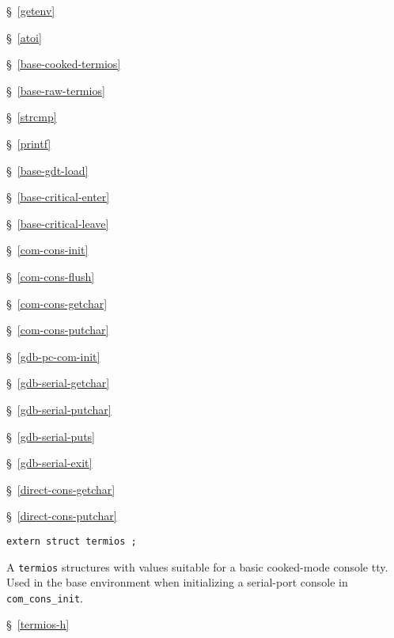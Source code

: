 \begin{apidep}
	\item[getenv]		\S~\ref{getenv}
	\item[atoi]		\S~\ref{atoi}
	\item[base_cooked_termios]	\S~\ref{base-cooked-termios}
	\item[base_raw_termios]	\S~\ref{base-raw-termios}
	\item[strcmp]		\S~\ref{strcmp}
	\item[printf]		\S~\ref{printf}
	\item[base_gdt_load]	\S~\ref{base-gdt-load}
	\item[base_critical_enter]	\S~\ref{base-critical-enter}
	\item[base_critical_leave]	\S~\ref{base-critical-leave}
	\item[com_cons_init]	\S~\ref{com-cons-init}
	\item[com_cons_flush]	\S~\ref{com-cons-flush}
	\item[com_cons_getchar]	\S~\ref{com-cons-getchar}
	\item[com_cons_putchar]	\S~\ref{com-cons-putchar}
	\item[gdb_pc_com_init]	\S~\ref{gdb-pc-com-init}
	\item[gdb_serial_getchar]	\S~\ref{gdb-serial-getchar}
	\item[gdb_serial_putchar]	\S~\ref{gdb-serial-putchar}
	\item[gdb_serial_puts]	\S~\ref{gdb-serial-puts}
	\item[gdb_serial_exit]	\S~\ref{gdb-serial-exit}
	\item[direct_cons_getchar]	\S~\ref{direct-cons-getchar}
	\item[direct_cons_putchar]	\S~\ref{direct-cons-putchar}
\end{apidep}

\label{base-cooked-termios}
\begin{apisyn}

	{\tt extern struct termios ;}
\end{apisyn}
\begin{apidesc}
	A \posix{} {\tt termios} structures with values suitable for a
	basic cooked-mode console tty.
	Used in the base environment when initializing a serial-port
	console in {\tt com_cons_init}.
\end{apidesc}
\begin{apidep}
	\item[termios.h]	\S~\ref{termios-h}
\end{apidep}

